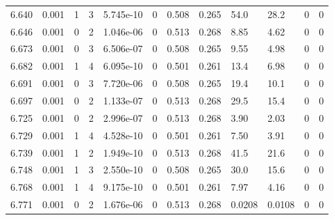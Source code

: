 \documentclass[preview]{standalone}
\begin{document}
{{{{{{{{{{{{{{{{{{\begin{tabular}{L{1.2cm}C{1.2cm} C{0.3cm}C{0.5cm} C{1.4cm}C{1.4cm} C{1.4cm}C{1.4cm} C{1.6cm}C{1.6cm} C{1.6cm}C{1.6cm}}
  6.640  &  0.001  & 1     &  3 &  5.745e-10  & 0  &  0.508&   0.265& 54.0 & 28.2   &  0 & 0  \\ 
  6.646  &  0.001  & 0     &  2 &  1.046e-06  & 0  &  0.513&   0.268& 8.85 & 4.62   &  0 & 0  \\ 
  6.673  &  0.001  & 0     &  3 &  6.506e-07  & 0  &  0.508&   0.265& 9.55 & 4.98   &  0 & 0  \\ 
  6.682  &  0.001  & 1     &  4 &  6.095e-10  & 0  &  0.501&   0.261& 13.4 & 6.98   &  0 & 0  \\ 
  6.691  &  0.001  & 0     &  3 &  7.720e-06  & 0  &  0.508&   0.265& 19.4 & 10.1   &  0 & 0  \\ 
  6.697  &  0.001  & 0     &  2 &  1.133e-07  & 0  &  0.513&   0.268& 29.5 & 15.4   &  0 & 0  \\ 
  6.725  &  0.001  & 0     &  2 &  2.996e-07  & 0  &  0.513&   0.268& 3.90 & 2.03   &  0 & 0  \\ 
  6.729  &  0.001  & 1     &  4 &  4.528e-10  & 0  &  0.501&   0.261& 7.50 & 3.91   &  0 & 0  \\ 
  6.739  &  0.001  & 1     &  2 &  1.949e-10  & 0  &  0.513&   0.268& 41.5 & 21.6   &  0 & 0  \\ 
  6.748  &  0.001  & 1     &  3 &  2.550e-10  & 0  &  0.508&   0.265& 30.0 & 15.6   &  0 & 0  \\ 
  6.768  &  0.001  & 1     &  4 &  9.175e-10  & 0  &  0.501&   0.261& 7.97 & 4.16   &  0 & 0  \\ 
  6.771  &  0.001  & 0     &  2 &  1.676e-06  & 0  &  0.513&   0.268& 0.0208 & 0.0108   &  0 & 0  \\ 
\hline 
\end{tabular} 

}}}}}}}}}}}}}}}}}}
\end{document}
